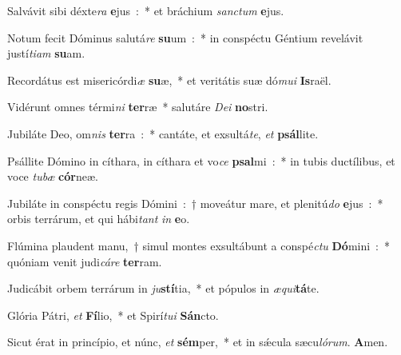 \item Salvávit sibi déxte\emph{ra} \textbf{e}jus~:~* et bráchium \emph{san}\emph{ctum} \textbf{e}jus.
\item Notum fecit Dóminus salutá\emph{re} \textbf{su}um~:~* in conspéctu Géntium revelávit justí\emph{ti}\emph{am} \textbf{su}am.
\item Recordátus est misericórdi\emph{æ} \textbf{su}æ,~* et veritátis suæ dó\emph{mu}\emph{i} \textbf{Is}raël.
\item Vidérunt omnes térmi\emph{ni} \textbf{ter}ræ~* salutáre \emph{De}\emph{i} \textbf{no}stri.
\item Jubiláte Deo, om\emph{nis} \textbf{ter}ra~:~* cantáte, et exsultá\emph{te}, \emph{et} \textbf{psál}lite.
\item Psállite Dómino in cíthara, in cíthara et vo\emph{ce} \textbf{psal}mi~:~* in tubis ductílibus, et voce \emph{tu}\emph{bæ} \textbf{cór}neæ.
\item Jubiláte in conspéc\-tu regis Dómini~:~† moveátur mare, et plenitú\emph{do} \textbf{e}jus~:~* orbis terrárum, et qui hábi\emph{tant} \emph{in} \textbf{e}o.
\item Flúmina plaudent manu,~† simul montes exsultábunt a conspé\emph{ctu} \textbf{Dó}mini~:~* quóniam venit judi\emph{cá}\emph{re} \textbf{ter}ram.
\item Judicábit orbem terrárum in \emph{ju}\textbf{stí}tia,~* et pópulos in \emph{æ}\emph{qui}\textbf{tá}te.
\item Glória Pátri, \emph{et} \textbf{Fí}lio,~* et Spirí\emph{tu}\emph{i} \textbf{Sán}cto.
\item Sicut érat in princípio, et núnc, \emph{et} \textbf{sém}per,~* et in sǽcula sæcu\emph{ló}\emph{rum}. \textbf{A}men.